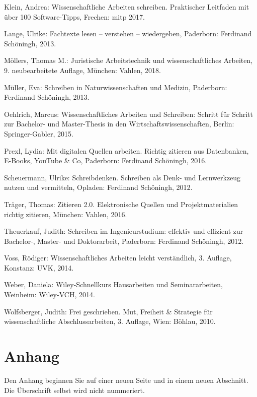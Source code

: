 \documentclass[a4paper,11pt]{article}%
\renewcommand{\\}{\vspace*{0.5\baselineskip} \newline}
\begin{document}
\begin{thebibliography}{1}
	Klein, Andrea: Wissenschaftliche Arbeiten schreiben. Praktischer Leitfaden mit über 100 Software-Tipps,
	Frechen: mitp
	2017.
	
	Lange, Ulrike: Fachtexte lesen – verstehen – wiedergeben,
	Paderborn: Ferdinand Schöningh,
	2013.
	
	Möllers, Thomas M.: Juristische Arbeitstechnik und wissenschaftliches Arbeiten, 9. neubearbeitete Auflage,
	München: Vahlen,
	2018.
	
	Müller, Eva: Schreiben in Naturwissenschaften und Medizin,
	Paderborn: Ferdinand Schöningh,
	2013.
	
	Oehlrich, Marcus: Wissenschaftliches Arbeiten und Schreiben: Schritt für Schritt zur Bachelor- und Master-Thesis in den Wirtschaftswissenschaften,
	Berlin: Springer-Gabler,
	2015.
	
	Prexl, Lydia: Mit digitalen Quellen arbeiten. Richtig zitieren aus Datenbanken, E-Books, YouTube \& Co,
	Paderborn: Ferdinand Schöningh,
	2016.
	
	Scheuermann, Ulrike: Schreibdenken. Schreiben als Denk- und Lernwerkzeug nutzen und vermitteln,
	Opladen: Ferdinand Schöningh,
	2012.
	
	Träger, Thomas: Zitieren 2.0. Elektronische Quellen und Projektmaterialien richtig zitieren,
	München: Vahlen,
	2016.
	
	Theuerkauf, Judith: Schreiben im Ingenieurstudium: effektiv und effizient zur Bachelor-, Master- und Doktorarbeit, Paderborn: Ferdinand Schöningh,
	2012.
	
	Voss, Rödiger: Wissenschaftliches Arbeiten leicht verständlich, 3. Auflage,
	Konstanz: UVK,
	2014.
	
	Weber, Daniela: Wiley-Schnellkurs Hausarbeiten und Seminararbeiten,
	Weinheim: Wiley-VCH,
	2014.
	
	Wolfsberger, Judith: Frei geschrieben. Mut, Freiheit \& Strategie für wissenschaftliche Abschlussarbeiten, 3. Auflage, Wien: Böhlau,
	2010.
	
\end{thebibliography}
\newpage
\appendix

\section*{Anhang}
Den Anhang beginnen Sie auf einer neuen Seite und in einem neuen Abschnitt. Die Überschrift selbst wird nicht nummeriert.
\end{document}
